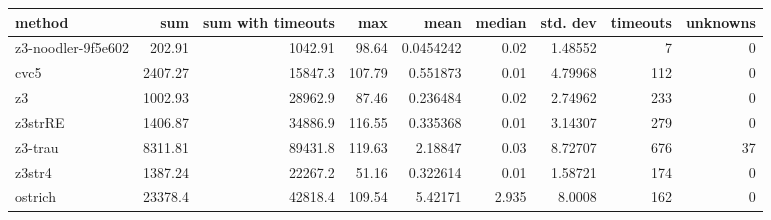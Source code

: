 \begin{tabular}{lrrrrrrrr}
\hline
 method             &      sum &   sum with timeouts &    max &      mean &   median &   std. dev &   timeouts &   unknowns \\
\hline
 z3-noodler-9f5e602 &   202.91 &             1042.91 &  98.64 & 0.0454242 &    0.02  &    1.48552 &          7 &          0 \\
 cvc5               &  2407.27 &            15847.3  & 107.79 & 0.551873  &    0.01  &    4.79968 &        112 &          0 \\
 z3                 &  1002.93 &            28962.9  &  87.46 & 0.236484  &    0.02  &    2.74962 &        233 &          0 \\
 z3strRE            &  1406.87 &            34886.9  & 116.55 & 0.335368  &    0.01  &    3.14307 &        279 &          0 \\
 z3-trau            &  8311.81 &            89431.8  & 119.63 & 2.18847   &    0.03  &    8.72707 &        676 &         37 \\
 z3str4             &  1387.24 &            22267.2  &  51.16 & 0.322614  &    0.01  &    1.58721 &        174 &          0 \\
 ostrich            & 23378.4  &            42818.4  & 109.54 & 5.42171   &    2.935 &    8.0008  &        162 &          0 \\
\hline
\end{tabular}
